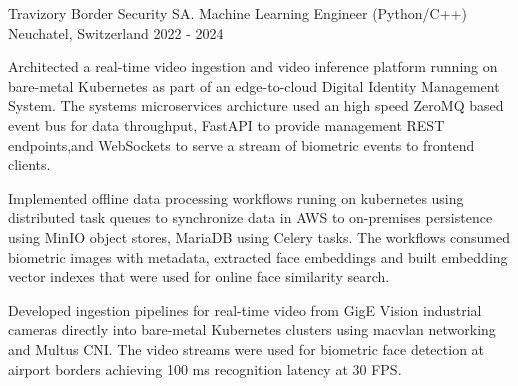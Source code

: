 

\begin{cventries}

\cventry
{Travizory Border Security SA.} %
{Machine Learning Engineer (Python/C++)} %
{Neuchatel, Switzerland} %
{2022 - 2024} %
{
  \begin{cvitems} %
    \item {
    Architected a real-time video ingestion and video inference platform running on 
    bare-metal Kubernetes as part of an edge-to-cloud Digital Identity Management 
    System. The systems microservices archicture used an high speed ZeroMQ based event bus for data 
    throughput, FastAPI to provide management REST endpoints,and WebSockets to 
    serve a stream of biometric events to frontend clients.}
    \item {
    Implemented offline data processing workflows runing on kubernetes using 
    distributed task queues to synchronize data in AWS 
    to on-premises persistence using MinIO object stores, MariaDB using Celery tasks. 
    The workflows consumed biometric images with metadata, extracted face embeddings and built 
    embedding vector indexes that were used for online face similarity search.}
    \item {
    Developed ingestion pipelines for real-time video from GigE Vision industrial cameras 
    directly into bare-metal Kubernetes clusters using macvlan networking and Multus CNI. 
    The video streams were used for biometric face detection at airport borders achieving 
    100 ms recognition latency at 30 FPS.}
  \end{cvitems}
}


\end{cventries}
